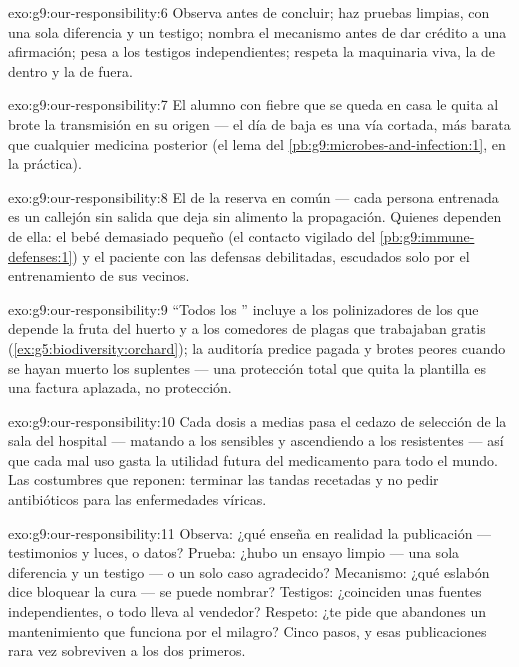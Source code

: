 \begin{solution}{exo:g9:our-responsibility:6}
Observa antes de concluir; haz pruebas limpias, con una sola diferencia
y un testigo; nombra el mecanismo antes de dar crédito a una
afirmación; pesa a los testigos independientes; respeta la maquinaria
viva, la de dentro y la de fuera.
\end{solution}

\begin{solution}{exo:g9:our-responsibility:7}
El alumno con fiebre que se queda en casa le quita al brote la
transmisión en su origen --- el día de baja es una vía cortada, más
barata que cualquier medicina posterior (el lema del
\cref{pb:g9:microbes-and-infection:1}, en la práctica).
\end{solution}

\begin{solution}{exo:g9:our-responsibility:8}
El de la reserva en común --- cada persona entrenada es un callejón sin
salida que deja sin alimento la propagación. Quienes dependen de ella:
el bebé demasiado pequeño (el contacto vigilado del
\cref{pb:g9:immune-defenses:1}) y el paciente con las defensas
debilitadas, escudados solo por el entrenamiento de sus vecinos.
\end{solution}

\begin{solution}{exo:g9:our-responsibility:9}
``Todos los '' incluye a los polinizadores de los que depende
la fruta del huerto y a los comedores de plagas que trabajaban gratis
(\cref{ex:g5:biodiversity:orchard}); la auditoría predice 
pagada y brotes peores cuando se hayan muerto los suplentes --- una
protección total que quita la plantilla es una factura aplazada, no
protección.
\end{solution}

\begin{solution}{exo:g9:our-responsibility:10}
Cada dosis a medias pasa el cedazo de selección de la sala del
hospital --- matando a los sensibles y ascendiendo a los resistentes
--- así que cada mal uso gasta la utilidad futura del medicamento para
todo el mundo. Las costumbres que reponen: terminar las tandas
recetadas y no pedir antibióticos para las enfermedades víricas.
\end{solution}

\begin{solution}{exo:g9:our-responsibility:11}
Observa: ¿qué enseña en realidad la publicación --- testimonios y
luces, o datos? Prueba: ¿hubo un ensayo limpio --- una sola diferencia
y un testigo --- o un solo caso agradecido? Mecanismo: ¿qué eslabón
dice bloquear la cura --- se puede nombrar? Testigos: ¿coinciden unas
fuentes independientes, o todo lleva al vendedor? Respeto: ¿te pide que
abandones un mantenimiento que funciona por el milagro? Cinco pasos, y
esas publicaciones rara vez sobreviven a los dos primeros.
\end{solution}

